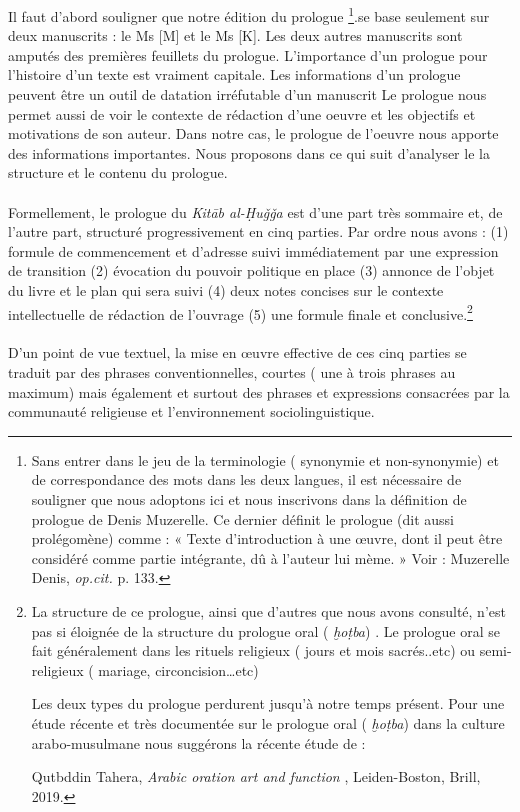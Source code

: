 \documentclass[a4paper,12pt]{report}
\begin{document}
\begin{itemize}
\begin{enumerate}
 Il faut d’abord souligner que notre édition du prologue \footnote{ Sans entrer dans le jeu de la terminologie ( synonymie et non-synonymie)  et de correspondance des  mots dans les deux  langues, il est nécessaire  de souligner que nous adoptons ici et nous inscrivons dans la définition  de prologue de Denis Muzerelle. Ce dernier définit le prologue (dit aussi prolégomène) comme : « Texte d’introduction à une œuvre, dont il peut être considéré comme partie intégrante, dû à l’auteur lui mème. »   Voir : Muzerelle Denis, \textit{op.cit.} p. 133.}.se base seulement sur deux  manuscrits : le Ms [M] et le Ms [K]. Les deux autres manuscrits sont amputés des premières feuillets du prologue.      L’importance  d’un prologue pour l’histoire d'un  texte est vraiment capitale.  Les informations d’un prologue peuvent être un outil de datation irréfutable d’un manuscrit  Le prologue  nous permet aussi de  voir le  contexte de rédaction d'une oeuvre et les objectifs et motivations de son auteur. Dans notre cas, le prologue de l'oeuvre nous apporte des informations importantes. Nous proposons dans ce qui suit d'analyser le la structure et le contenu du prologue.
 
 \paragraph{}
 Formellement, le  prologue   du  \textit{Kitāb al-Ḥuǧǧa } est d’une part très sommaire et, de l’autre part, structuré  progressivement en cinq parties.  Par ordre  nous avons : (1)   formule de commencement et d’adresse suivi immédiatement par une expression de transition  (2)  évocation du pouvoir politique en place (3) annonce de l’objet du livre et le plan qui sera  suivi (4) deux notes concises sur le  contexte intellectuelle de rédaction de  l’ouvrage  (5) une formule finale et conclusive.\footnote{La structure de ce prologue, ainsi que d’autres que nous avons consulté, n’est pas si éloignée  de la structure du prologue oral  ( \textit{ḫoṭba}) . Le prologue oral se fait généralement dans les rituels religieux ( jours et mois sacrés..etc) ou semi-religieux  ( mariage, circoncision…etc)
 
 Les deux types du prologue  perdurent jusqu’à notre temps présent.  
Pour une étude récente et très documentée sur le prologue oral ( \textit{ḫoṭba}) dans la culture arabo-musulmane nous suggérons la récente étude  de : 

Qutbddin Tahera, \textit{ Arabic oration art and function }, Leiden-Boston, Brill, 2019. 
} 
\paragraph{}
D’un point de vue textuel, la mise en œuvre  effective de ces cinq parties se traduit par des phrases conventionnelles, courtes  ( une à trois phrases au maximum) mais également et surtout des phrases et expressions consacrées par la communauté religieuse et l’environnement sociolinguistique. 


\end{enumerate}
\end{itemize}
\end{document}

